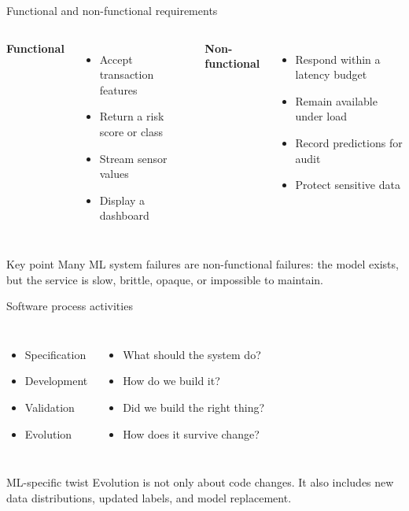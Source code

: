 \begin{frame}{Functional and non-functional requirements}
\begin{columns}[T]
\textbf{Functional}
\begin{itemize}
\item Accept transaction features
\item Return a risk score or class
\item Stream sensor values
\item Display a dashboard
\end{itemize}
\textbf{Non-functional}
\begin{itemize}
\item Respond within a latency budget
\item Remain available under load
\item Record predictions for audit
\item Protect sensitive data
\end{itemize}
\end{columns}
\vspace{0.5em}
\begin{block}{Key point}
Many ML system failures are non-functional failures: the model exists, but the service is slow, brittle, opaque, or impossible to maintain.
\end{block}
\coursefooter
\end{frame}

\begin{frame}{Software process activities}
\begin{columns}[T]
\begin{itemize}
\item Specification
\item Development
\item Validation
\item Evolution
\end{itemize}
\begin{itemize}
\item What should the system do?
\item How do we build it?
\item Did we build the right thing?
\item How does it survive change?
\end{itemize}
\end{columns}
\vspace{0.6em}
\begin{block}{ML-specific twist}
Evolution is not only about code changes. It also includes new data distributions, updated labels, and model replacement.
\end{block}
\coursefooter
\end{frame}

